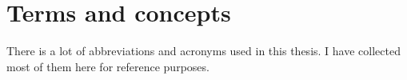 
\chapter{Terms and concepts}
\label{cha:terms-and-concepts}


There is a lot of abbreviations and acronyms used in this thesis.  I
have collected most of them here for reference purposes.

\begin{description}
  

\end{description}
